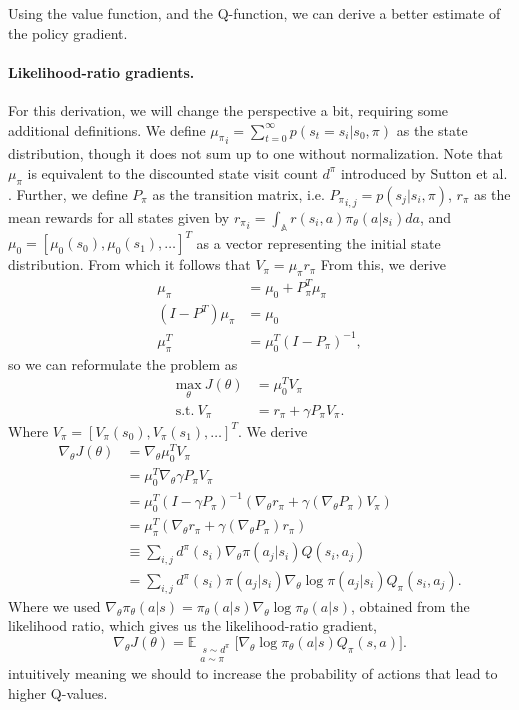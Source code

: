 Using the value function, and the Q-function, we can derive a better estimate of the policy gradient.

\paragraph{Likelihood-ratio gradients.} 
For this derivation, we will change the perspective a bit, requiring some additional definitions. 
We define ${\mu_\pi}_i = \sum_{t=0}^{\infty} p(s_t=s_i | s_0, \pi)$ \cite{puterman2014markov} as the state distribution, though it does not sum up to one without normalization. Note that $\mu_\pi$ is equivalent to the discounted state visit count $d^\pi$ introduced by Sutton et al. \cite{Sutton:1999:PGM:3009657.3009806}.
Further, we define $P_\pi$ as the transition matrix, i.e. ${P_\pi}_{i,j}=p(s_j|s_i,\pi)$, $r_\pi$ as the mean rewards for all states given by ${r_\pi}_i = \int_\mathbb{A} r(s_i,a)\pi_\theta(a|s_i) da$, and $\mu_0 = \left[\mu_0(s_0),\mu_0(s_1),\ldots\right]^T$ as a vector representing the initial state distribution.
From which it follows that $V_\pi = \mu_\pi r_\pi$
From this, we derive
\begin{align}
	\mu_\pi &= \mu_0 + P_\pi^T \mu_\pi \nonumber \\
	(I-P^T)\mu_\pi &= \mu_0 \nonumber \\
	\mu_\pi^T &= \mu_0^T (I-P_\pi)^{-1} ,
\end{align}
so we can reformulate the problem as 
\begin{align}
	\underset{\theta}{\text{max}}\ J(\theta) &= \mu_0^T V_\pi \\
	\text{s.t.}\ V_\pi &= r_\pi + \gamma P_\pi V_\pi . \nonumber
\end{align}
Where $V_\pi = \left[ V_\pi(s_0), V_\pi(s_1), \ldots \right]^T$. We derive 
\begin{align*}
	\nabla_\theta J(\theta) &= \nabla_\theta \mu_0^T V_\pi
	\\ &= \mu_0^T \nabla_\theta \gamma P_\pi V_\pi
	\\ &= \mu_0^T (I - \gamma P_\pi)^{-1} (\nabla_\theta r_\pi + \gamma (\nabla_\theta P_\pi) V_\pi)
	\\ &= \mu_\pi^T (\nabla_\theta r_\pi + \gamma (\nabla_\theta P_\pi) r_\pi)
	\\ &\equiv \sum\nolimits_{i,j} d^\pi(s_i) \nabla_\theta\pi(a_j|s_i) Q(s_i,a_j)
	\\ &= \sum\nolimits_{i,j} d^\pi(s_i) \pi(a_j|s_i) \nabla_\theta\log\pi(a_j|s_i) Q_\pi(s_i,a_j).
\end{align*}
Where we used $\nabla_\theta \pi_\theta(a|s) = \pi_\theta(a|s)\nabla_\theta\log\pi_\theta(a|s)$, obtained from the likelihood ratio, which gives us the likelihood-ratio gradient,
\begin{equation}
	\nabla_\theta J(\theta) = \mathbb{E}_{\substack{\ s \sim d^\pi \\a \sim \pi}} \Big[\nabla_\theta{\log\pi_\theta(a|s)}Q_\pi(s,a)\Big].
	\label{eqn:like-grad}
\end{equation}
intuitively meaning we should to increase the probability of actions that lead to higher Q-values.

